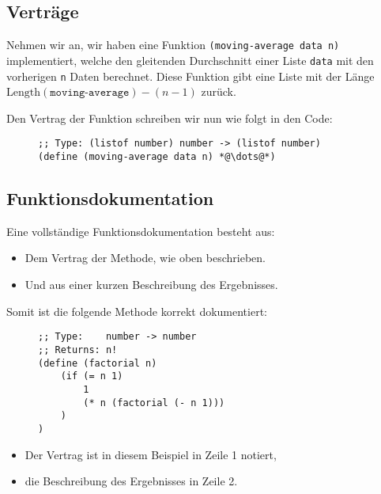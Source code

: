 
\subsection{Verträge}
	
	Nehmen wir an, wir haben eine Funktion \texttt{(moving-average data n)} implementiert, welche den gleitenden Durchschnitt einer Liste \texttt{data} mit den vorherigen \texttt{n} Daten berechnet. Diese Funktion gibt eine Liste mit der Länge \( \text{Length}(\texttt{moving-average}) - (n - 1) \) zurück.
	
	Den Vertrag der Funktion schreiben wir nun wie folgt in den Code:
	\begin{figure}[H] %
		\centering
		\begin{lstlisting}[language = Racket]
;; Type: (listof number) number -> (listof number)
(define (moving-average data n) *@\dots@*)
\end{lstlisting}
	\end{figure}

\subsection{Funktionsdokumentation}
	Eine vollständige Funktionsdokumentation besteht aus:
	\begin{itemize}
		\item Dem Vertrag der Methode, wie oben beschrieben.
		\item Und aus einer kurzen Beschreibung des Ergebnisses.
	\end{itemize}

	Somit ist die folgende Methode korrekt dokumentiert:
	\begin{figure}[H]
		\centering
		\begin{lstlisting}[language = Racket]
;; Type:    number -> number
;; Returns: n!
(define (factorial n)
	(if (= n 1)
		1
		(* n (factorial (- n 1)))
	)
)
\end{lstlisting}
	\end{figure}
	\begin{itemize}
		\item Der Vertrag ist in diesem Beispiel in Zeile 1 notiert,
		\item die Beschreibung des Ergebnisses in Zeile 2.
	\end{itemize}
